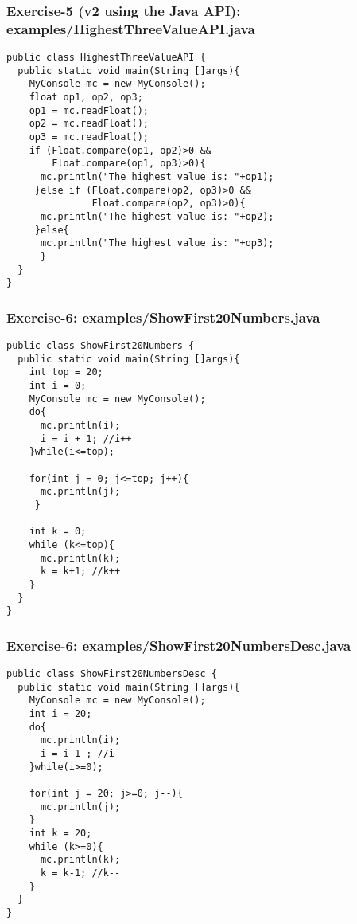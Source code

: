 \documentclass[xcolor=dvipsnames,dvip,notes=show,handout,table]{beamer}
\begin{document}
\begin{frame}[fragile]
\frametitle{Exercise-5 (v2 using the Java API): examples/HighestThreeValueAPI.java}
\scriptsize
\begin{lstlisting}
public class HighestThreeValueAPI {
  public static void main(String []args){
    MyConsole mc = new MyConsole();
    float op1, op2, op3;
    op1 = mc.readFloat();
    op2 = mc.readFloat();
    op3 = mc.readFloat();
    if (Float.compare(op1, op2)>0 && 
        Float.compare(op1, op3)>0){
      mc.println("The highest value is: "+op1);
     }else if (Float.compare(op2, op3)>0 && 
               Float.compare(op2, op3)>0){
      mc.println("The highest value is: "+op2);
     }else{
      mc.println("The highest value is: "+op3);
      }
  }
}
\end{lstlisting}
\end{frame}




\begin{frame}[fragile]
\frametitle{Exercise-6: examples/ShowFirst20Numbers.java}
\scriptsize
\begin{lstlisting}
public class ShowFirst20Numbers {
  public static void main(String []args){
    int top = 20;
    int i = 0;
    MyConsole mc = new MyConsole();
    do{
      mc.println(i);
      i = i + 1; //i++
    }while(i<=top);

    for(int j = 0; j<=top; j++){
      mc.println(j);
     }
    
    int k = 0;
    while (k<=top){
      mc.println(k);
      k = k+1; //k++
    }
  }
}
\end{lstlisting}
\end{frame}




\begin{frame}[fragile]
\frametitle{Exercise-6: examples/ShowFirst20NumbersDesc.java}
\scriptsize
\begin{lstlisting}
public class ShowFirst20NumbersDesc {
  public static void main(String []args){		
    MyConsole mc = new MyConsole();
    int i = 20;
    do{
      mc.println(i);
      i = i-1 ; //i--
    }while(i>=0);

    for(int j = 20; j>=0; j--){
      mc.println(j);
    }
    int k = 20;
    while (k>=0){
      mc.println(k);
      k = k-1; //k--
    }
  }
}
\end{lstlisting}
\end{frame}
\end{document}
